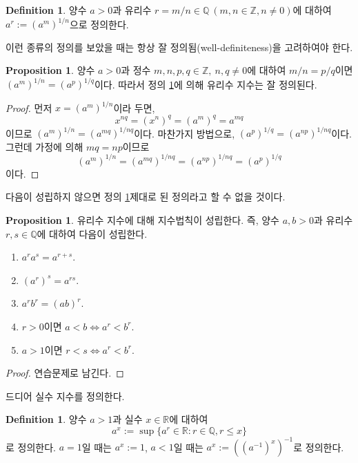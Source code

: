 \documentclass[11pt]{book}
\numberwithin{equation}{chapter}
\def\ZZ{\mathbb{Z}}
\def\QQ{\mathbb{Q}}
\def\RR{\mathbb{R}}
\theoremstyle{definition}
\newtheorem{prop}[thm]{Proposition}
\newtheorem{defn}[thm]{Definition}
\begin{document}
    \begin{defn} \label{def 1.3.10}
        양수 \(a > 0\)과 유리수 \(r = m/n \in \QQ \ (m, n \in \ZZ, n \ne 0)\)에 대하여 \(a^r := (a^m)^{1/n}\)으로 정의한다.
    \end{defn}

이런 종류의 정의를 보았을 때는 항상 잘 정의됨(well-definiteness)을 고려하여야 한다.

    \begin{prop}
        양수 \(a > 0\)과 정수 \(m, n, p, q \in \ZZ, \ n, q \ne 0\)에 대하여 \(m/n = p/q\)이면 \((a^m)^{1/n} = (a^p)^{1/q}\)이다. 따라서 정의 \ref{def 1.3.10}에 의해 유리수 지수는 잘 정의된다.
    \end{prop}
    \begin{proof}
        먼저 \(x = (a^m)^{1/n}\)이라 두면,
        \[
        x^{nq} = (x^n)^q = (a^m)^q = a^{mq}   
        \]
        이므로 \((a^m)^{1/n} = (a^{mq})^{1/nq}\)이다. 마찬가지 방법으로, \((a^p)^{1/q} = (a^{np})^{1/nq}\)이다. 그런데 가정에 의해 \(mq = np\)이므로
        \[
            (a^m)^{1/n} = (a^{mq})^{1/nq} = (a^{np})^{1/nq} = (a^p)^{1/q}
        \]
        이다.
    \end{proof}

다음이 성립하지 않으면 정의 \ref{def 1.3.10}\이 제대로 된 정의라고 할 수 없을 것이다.

    \begin{prop}
        유리수 지수에 대해 지수법칙이 성립한다. 즉, 양수 \(a, b > 0\)과 유리수 \(r, s \in \QQ\)에 대하여 다음이 성립한다.
        \begin{enumerate}[label=(\alph*), leftmargin=2\parindent]
            \item \(a^r a^s = a^{r+s}\).
            \item \((a^r)^s = a^{rs}\).
            \item \(a^r b^r = (ab)^r\).
            \item \(r > 0\)이면 \(a < b \iff a^r < b^r\).
            \item \(a > 1\)이면 \(r < s \iff a^r < b^r\).
        \end{enumerate}
    \end{prop}
    \begin{proof}
        연습문제로 남긴다.
    \end{proof}

드디어 실수 지수를 정의한다.

    \begin{defn} \label{def 1.3.13}
        양수 \(a > 1\)과 실수 \(x \in \RR\)에 대하여
        \[
            a^x := \sup \{a^r \in \RR : r \in \QQ, r \le x\}
        \]
        로 정의한다. \(a = 1\)일 때는 \(a^x := 1\), \(a < 1\)일 때는 \(a^x := ((a^{-1})^x)^{-1}\)로 정의한다.
    \end{defn}
\end{document}

